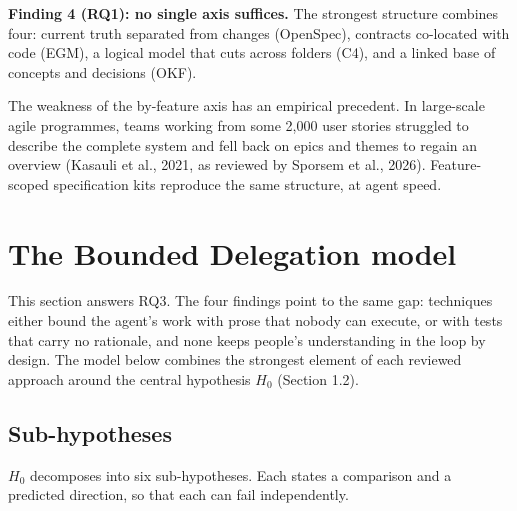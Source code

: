 \documentclass[11pt]{article}
\begin{document}
\textbf{Finding 4 (RQ1): no single axis suffices.} The strongest structure combines four: current truth separated from changes (OpenSpec), contracts co-located with code (EGM), a logical model that cuts across folders (C4), and a linked base of concepts and decisions (OKF).

The weakness of the by-feature axis has an empirical precedent. In large-scale agile programmes, teams working from some 2,000 user stories struggled to describe the complete system and fell back on epics and themes to regain an overview (Kasauli et al., 2021, as reviewed by Sporsem et al., 2026). Feature-scoped specification kits reproduce the same structure, at agent speed.

\section{The Bounded Delegation model}

This section answers RQ3. The four findings point to the same gap: techniques either bound the agent's work with prose that nobody can execute, or with tests that carry no rationale, and none keeps people's understanding in the loop by design. The model below combines the strongest element of each reviewed approach around the central hypothesis $H_0$ (Section 1.2).

\subsection{Sub-hypotheses}

$H_0$ decomposes into six sub-hypotheses. Each states a comparison and a predicted direction, so that each can fail independently.
\end{document}
